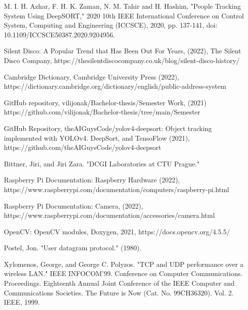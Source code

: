 \documentclass{ctuthesis}
\begin{document}
\begin{thebibliography}{1}

  M. I. H. Azhar, F. H. K. Zaman, N. M. Tahir and H. Hashim, "People Tracking System Using DeepSORT," 2020 10th IEEE International Conference on Control System, Computing and Engineering (ICCSCE), 2020, pp. 137-141, doi: 10.1109/ICCSCE50387.2020.9204956.

  Silent Disco: A Popular Trend that Has Been Out For Years, (2022), The Silent Disco Company, https://thesilentdiscocompany.co.uk/blog/silent-disco-history/
 
  Cambridge Dictionary, Cambridge University Press (2022), https://dictionary.cambridge.org/dictionary/english/public-address-system
 
  GitHub repository, vilijonak/Bachelor-thesis/Semester Work, (2021) https://github.com/vilijonak/Bachelor-thesis/tree/main/Semester%
 
  GitHub Repository, theAIGuysCode/yolov4-deepsort: Object tracking implemented with YOLOv4. DeepSort, and TensoFlow (2021), https://github.com/theAIGuysCode/yolov4-deepsort

 Bittner, Jiri, and Jiri Zara. "DCGI Laboratories at CTU Prague."

  Raspberry Pi Documentation: Raspberry Hardware (2022), https://www.raspberrypi.com/documentation/computers/raspberry-pi.html

  Raspberry Pi Documentation: Camera, (2022), https://www.raspberrypi.com/documentation/accessories/camera.html
 
  OpenCV: OpenCV modules, Doxygen, 2021, https://docs.opencv.org/4.5.5/
 
  Postel, Jon. "User datagram protocol." (1980).
 
  Xylomenos, George, and George C. Polyzos. "TCP and UDP performance over a wireless LAN." IEEE INFOCOM'99. Conference on Computer Communications. Proceedings. Eighteenth Annual Joint Conference of the IEEE Computer and Communications Societies. The Future is Now (Cat. No. 99CH36320). Vol. 2. IEEE, 1999.



\end{thebibliography}
\end{document}
